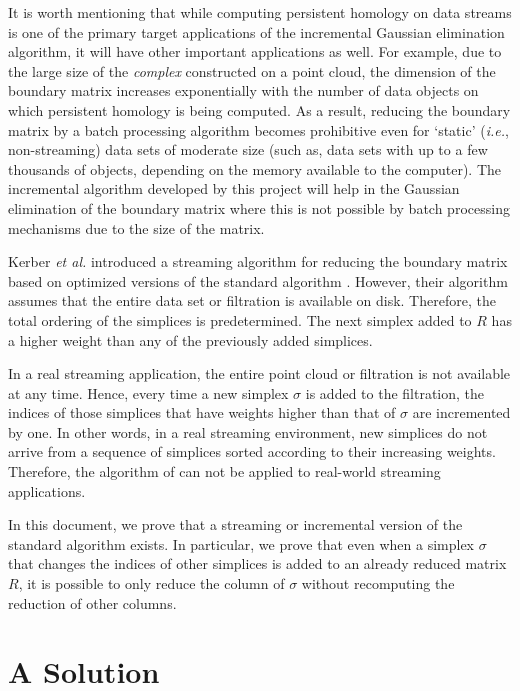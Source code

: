 \documentclass[11pt]{article}
\begin{document}
It is worth mentioning that while computing persistent homology on data streams is one of the 
primary target applications of the incremental Gaussian elimination algorithm, it will have other 
important applications as well.  For example, due to the large size of the \emph{complex} 
constructed on a point cloud, the dimension of the boundary matrix increases exponentially with the 
number of data objects on which persistent homology is being computed.  As a result, reducing the 
boundary matrix by a batch processing algorithm becomes prohibitive even for `static' (\emph{i.e.}, 
non-streaming) data sets of moderate size (such as, data sets with up to a few thousands of 
objects, depending on the memory available to the computer).  The incremental algorithm developed 
by this project will help in the Gaussian elimination of the boundary matrix where this is 
not possible by batch processing mechanisms due to the size of the matrix.


Kerber \textit{et al.} \cite{kerber-18} introduced a streaming algorithm for reducing the boundary 
matrix based on optimized versions of the standard algorithm \cite{edelsbrunner-00, 
zomorodian-05}.  However, their algorithm assumes that the entire data set or filtration is 
available on disk.  Therefore, the total ordering of the simplices is predetermined.  The next 
simplex added to $R$ has a higher weight than any of the previously added simplices.


In a real streaming application, the entire point cloud or filtration is not available at any 
time.  Hence, every time a new simplex $\sigma$ is added to the filtration, the indices of those 
simplices that have weights higher than that of $\sigma$ are incremented by one.  In other words, 
in a real streaming environment, new simplices do not arrive from a sequence of simplices sorted 
according to their increasing weights.  Therefore, the algorithm of \cite{kerber-18} can not be 
applied to real-world streaming applications.



In this document, we prove that a streaming or incremental version of the standard algorithm 
exists.  In particular, we prove that even when a simplex $\sigma$ that changes the 
indices of other simplices is added to an already reduced matrix $R$, it is possible to only reduce 
the column of $\sigma$ without recomputing the reduction of other columns.



\section{A Solution}
\end{document}
